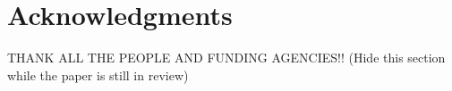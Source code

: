 \section*{Acknowledgments}

THANK ALL THE PEOPLE AND FUNDING AGENCIES!! (Hide this section while the paper is still in review)
